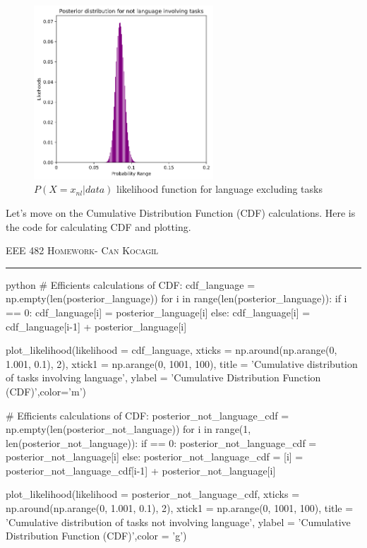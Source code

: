 \documentclass[12pt]{amsart}
\begin{document}
 \begin{figure}[h]
    \centering
    \includegraphics[width = 0.6\textwidth]{images/4.png}
    \caption{$P(X=x_{nl}|data)$ likelihood function for language excluding  tasks }
\end{figure}


Let’s move on the Cumulative Distribution Function (CDF) calculations. Here is the code for calculating CDF and plotting.


\newpage
{\scshape EEE 482} \hfill {\scshape \large  Homework-\relax} \hfill {\scshape Can Kocagil}
\smallskip
\hrule

 \begin{mintedbox}{python}
# Efficients calculations of CDF:
cdf_language = np.empty(len(posterior_language))
for i in range(len(posterior_language)):
    if i == 0:
        cdf_language[i] = posterior_language[i]
    else:
        cdf_language[i] = cdf_language[i-1] + posterior_language[i]

plot_likelihood(likelihood = cdf_language,
                xticks     = np.around(np.arange(0, 1.001, 0.1), 2),
                xtick1     = np.arange(0, 1001, 100),
                title      = 'Cumulative distribution of tasks involving language',
                ylabel     = 'Cumulative Distribution Function (CDF)',color='m')

# Efficients calculations of CDF:
posterior_not_language_cdf = np.empty(len(posterior_not_language))
for i in range(1, len(posterior_not_language)):
    if == 0:
        posterior_not_language_cdf = posterior_not_language[i]
    else:
        posterior_not_language_cdf = [i] = posterior_not_language_cdf[i-1] + posterior_not_language[i]

plot_likelihood(likelihood = posterior_not_language_cdf,
                xticks     = np.around(np.arange(0, 1.001, 0.1), 2),
                xtick1     = np.arange(0, 1001, 100),
                title      = 'Cumulative distribution of tasks not involving language',
                ylabel     = 'Cumulative Distribution Function (CDF)',color      = 'g')

\end{mintedbox}
\end{document}
